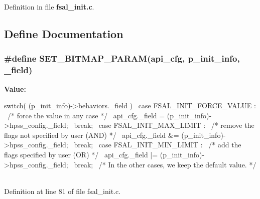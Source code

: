 Definition in file {\bf fsal\_\-init.c}.

\subsection{Define Documentation}
\subsubsection[{SET\_\-BITMAP\_\-PARAM}]{\setlength{\rightskip}{0pt plus 5cm}\#define SET\_\-BITMAP\_\-PARAM(api\_\-cfg, \/  p\_\-init\_\-info, \/  \_\-field)}\label{fsal__init_8c_ad4acf7e55a5ad7300edb9d27c5865001}
{\bfseries Value:}
\begin{DoxyCode}
switch( (p_init_info)->behaviors._field ){                \
      case FSAL_INIT_FORCE_VALUE :                            \
        /* force the value in any case */                     \
        api_cfg._field = (p_init_info)->hpss_config._field;   \
        break;                                                \
      case FSAL_INIT_MAX_LIMIT :                              \
        /* remove the flags not specified by user (AND) */    \
        api_cfg._field &= (p_init_info)->hpss_config._field;  \
        break;                                                \
      case FSAL_INIT_MIN_LIMIT :                              \
        /* add the flags specified by user (OR) */            \
        api_cfg._field |= (p_init_info)->hpss_config._field;  \
        break;                                                \
    /* In the other cases, we keep the default value. */      \
    }                                                         \
\end{DoxyCode}


Definition at line 81 of file fsal\_\-init.c.
